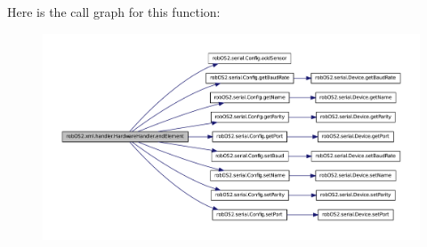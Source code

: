Here is the call graph for this function:\nopagebreak
\begin{figure}[H]
\begin{center}
\leavevmode
\includegraphics[width=400pt]{classrob_o_s2_1_1xml_1_1handler_1_1_hardware_handler_a431b96e478c956f8f794e2034914ed4e_cgraph}
\end{center}
\end{figure}


